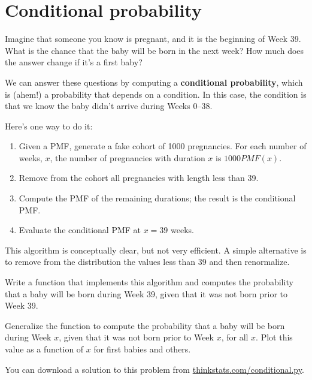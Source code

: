 \documentclass[12pt]{book}
\begin{document}
\section{Conditional probability}

Imagine that someone you know is pregnant, and it is the beginning of
Week 39.  What is the chance that the baby will be born in the next
week?  How much does the answer change if it's a first baby?

We can answer these questions by computing a {\bf conditional
probability}, which is (ahem!) a probability that depends on a condition.
In this case, the condition is that we know the baby didn't arrive
during Weeks 0--38.

Here's one way to do it:

\begin{enumerate}

\item Given a PMF, generate a fake cohort of 1000 pregnancies.
For each number of weeks, $x$, the number of pregnancies with
duration $x$ is $1000 PMF(x)$.

\item Remove from the cohort all pregnancies with length less than 39.

\item Compute the PMF of the remaining durations; the result is the
conditional PMF.

\item Evaluate the conditional PMF at $x = 39$ weeks.

\end{enumerate}

This algorithm is conceptually clear, but not very efficient.
A simple alternative is to remove from the distribution the values
less than 39 and then renormalize.

\begin{ex}

Write a function that implements this algorithm and computes the
probability that a baby will be born during Week 39, given that
it was not born prior to Week 39.

Generalize the function to compute the
probability that a baby will be born during Week $x$, given that
it was not born prior to Week $x$, for all $x$.
Plot this value as a function of $x$ for first babies and others.

You can download a solution to this problem from
\url{thinkstats.com/conditional.py}.

\end{ex}
\end{document}
